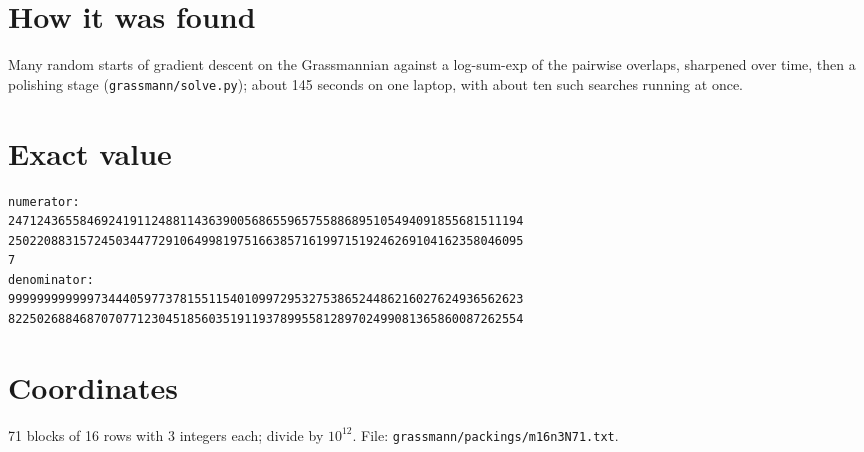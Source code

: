\documentclass[11pt,a4paper]{article}
\begin{document}
\section{How it was found}
Many random starts of gradient descent on the Grassmannian against a log-sum-exp of the pairwise overlaps, sharpened over time, then a polishing stage (\texttt{grassmann/solve.py}); about 145 seconds on one laptop, with about ten such searches running at once.


\appendix
\section{Exact value}
{\small
\begin{verbatim}
numerator:
247124365584692419112488114363900568655965755886895105494091855681511194
250220883157245034477291064998197516638571619971519246269104162358046095
7
denominator:
999999999999734440597737815511540109972953275386524486216027624936562623
822502688468707077123045185603519119378995581289702499081365860087262554
\end{verbatim}}

\section{Coordinates}
71 blocks of 16 rows with 3 integers each; divide by $10^{12}$. File: \texttt{grassmann/packings/m16n3N71.txt}.
{\tiny
\begin{multicols}{3}
\end{multicols}}
\end{document}
